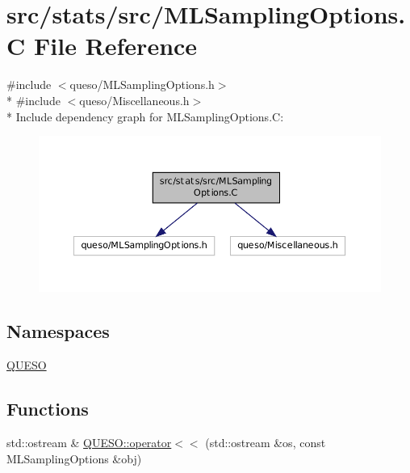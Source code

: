 \hypertarget{_m_l_sampling_options_8_c}{\section{src/stats/src/\-M\-L\-Sampling\-Options.C File Reference}
\label{_m_l_sampling_options_8_c}
}
{\ttfamily \#include $<$queso/\-M\-L\-Sampling\-Options.\-h$>$}\\*
{\ttfamily \#include $<$queso/\-Miscellaneous.\-h$>$}\\*
Include dependency graph for M\-L\-Sampling\-Options.\-C\-:
\nopagebreak
\begin{figure}[H]
\begin{center}
\leavevmode
\includegraphics[width=350pt]{_m_l_sampling_options_8_c__incl}
\end{center}
\end{figure}
\subsection*{Namespaces}
\begin{DoxyCompactItemize}
\item 
\hyperlink{namespace_q_u_e_s_o}{Q\-U\-E\-S\-O}
\end{DoxyCompactItemize}
\subsection*{Functions}
\begin{DoxyCompactItemize}
\item 
std\-::ostream \& \hyperlink{namespace_q_u_e_s_o_a5986e83af9a9a4845f9eeb03d94a8a94}{Q\-U\-E\-S\-O\-::operator$<$$<$} (std\-::ostream \&os, const M\-L\-Sampling\-Options \&obj)
\end{DoxyCompactItemize}
